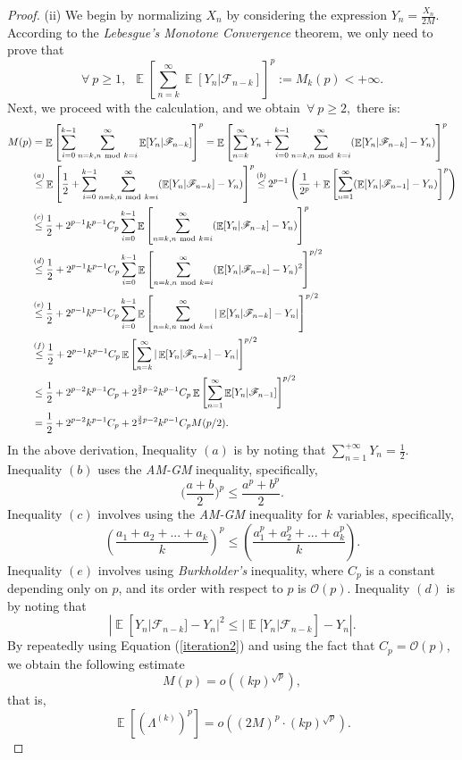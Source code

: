 \documentclass{article} %
\DeclareMathOperator{\Expect}{\mathbb{E}}
\begin{document}
\begin{proof}
(ii) We begin by normalizing \(X_{n}\) by considering the expression \(Y_{n}= \frac{X_{n}}{2M}\). According to the \emph{Lebesgue's Monotone Convergence} theorem, we only need to prove that $$\forall\ p \ge 1,\ \ \Expect\left[\sum_{n=k}^{\infty}\Expect[Y_{n}|\mathscr{F}_{n-k}]\right]^{p}:=M_{k}(p)<+\infty.$$
Next, we proceed with the calculation, and we obtain\ $\forall\ p\ge 2,$ there is:
\begin{align}\label{iteration2}
M(p)&=\Expect\left[\sum_{i=0}^{k-1}\sum_{n=k,n\ \text{mod}\  k=i}^{\infty}\Expect[Y_{n}|\mathscr{F}_{n-k}]\right]^{p}= \Expect\left[\sum_{n=k}^{\infty}Y_{n}+\sum_{i=0}^{k-1}\sum_{n=k,n\ \text{mod}\  k=i}^{\infty}(\Expect[Y_{n}|\mathscr{F}_{n-k}]-Y_{n})\right]^{p}\notag\\&\mathop{\le}^{(a)} \Expect\left[\frac{1}{2}+\sum_{i=0}^{k-1}\sum_{n=k,n\ \text{mod}\ k=i}^{\infty}(\Expect[Y_{n}|\mathscr{F}_{n-k}]-Y_{n})\right]^{p}  \mathop{\le}^{(b)}2^{p-1}\left(\frac{1}{2^p}+\Expect\left[\sum_{n=1}^{\infty}(\Expect[Y_{n}|\mathscr{F}_{n-1}]-Y_{n})\right]^{p}\right)\notag\\&\mathop{\le}^{(c)}\frac{1}{2}+2^{p-1}k^{p-1}C_{p}\sum_{i=0}^{k-1}\Expect\left[\sum_{n=k,n\ \text{mod}\ k=i}^{\infty}(\Expect[Y_{n}|\mathscr{F}_{n-k}]-Y_{n})\right]^{p}\notag\\&\mathop{\le}^{(d)}\frac{1}{2}+2^{p-1}k^{{p}-1}C_{p}\sum_{i=0}^{k-1}\Expect\left[\sum_{n=k,n\ \text{mod}\ k=i}^{\infty}(\Expect[Y_{n}|\mathscr{F}_{n-k}]-Y_{n})^{2}\right]^{p/2}\notag\\&\mathop{\le}^{(e)}\frac{1}{2}+2^{p-1}k^{{p}-1}C_{p}\sum_{i=0}^{k-1}\Expect\left[\sum_{n=k,n\ \text{mod}\ k=i}^{\infty}|\Expect[Y_{n}|\mathscr{F}_{n-k}]-Y_{n}|\right]^{p/2}\notag\\&\mathop{\le}^{(f)}\frac{1}{2}+2^{p-1}k^{{p}-1}C_{p}\Expect\left[\sum_{n=k}^{\infty}|\Expect[Y_{n}|\mathscr{F}_{n-k}]-Y_{n}|\right]^{p/2}\notag\\&\le 
\frac{1}{2}+2^{p-2}k^{p-1}C_{p}+2^{\frac{3}{2}p-2}k^{p-1}C_{p}\Expect\left[\sum_{n=1}^{\infty}\Expect[Y_{n}|\mathscr{F}_{n-1}]\right]^{p/2}\notag\\&=\frac{1}{2}+2^{p-2}k^{p-1}C_{p}+2^{\frac{3}{2}p-2}k^{p-1}C_{p}M(p/2).
\end{align}
In the above derivation, Inequality $(a)$ is by noting that $\sum_{n=1}^{+\infty}Y_{n}=\frac{1}{2}.$ Inequality $(b)$ uses the \emph{AM-GM} inequality, specifically,
\[
\bigg(\frac{a+b}{2}\bigg)^{p} \leq \frac{a^{p} + b^{p}}{2}.
\]
Inequality $(c)$ involves using the \emph{AM-GM} inequality for $k$ variables, specifically,
\[\left(\frac{a_{1}+a_{2}+...+a_{k}}{k}\right)^{p}\le \left(\frac{a_{1}^{p}+a_{2}^{p}+...+a_{k}^{p}}{k}\right).\]
Inequality $(e)$ involves using \emph{Burkholder's} inequality, where $C_{p}$ is a constant depending only on $p$, and its order with respect to $p$ is $\mathcal{O}(p)$. Inequality $(d)$ is by noting that $$|\Expect[Y_{n}|\mathscr{F}_{n-k}]-Y_{n}|^{2} \leq |\Expect[Y_{n}|\mathscr{F}_{n-k}]-Y_{n}|.$$
By repeatedly using Equation (\ref{iteration2}) and using the fact that $C_{p} = \mathcal{O}(p)$, we obtain the following estimate
\[
M(p) = o((kp)^{\sqrt{p}}),
\] that is,
\[\Expect[(\Lambda^{(k)})^{p}]=o((2M)^{p}\cdot (kp)^{\sqrt{p}}).\]


\end{proof}
\end{document}
